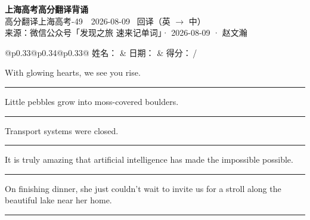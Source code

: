 \documentclass[11pt,a4paper]{article}
\newcommand{\num}[1]{\makebox[1.9em][r]{#1.}\hspace{0.3em}}
\newcommand{\wline}{\noindent\rule{\linewidth}{0.4pt}}
\begin{document}
\pagestyle{plain}
\begin{center}
{\LARGE\bfseries 上海高考高分翻译背诵 }\\[0.25em]
{\large 高分翻译上海高考-49　2026-08-09 \quad\ 回译（英 $\to$ 中）}\\[0.35em]
{\footnotesize 来源：微信公众号「发现之旅 速来记单词」· 2026-08-09 · 赵文瀚}
\end{center}

\vspace{0.4em}
\noindent\begin{tabular}{@{}p{0.33\textwidth}@{}p{0.34\textwidth}@{}p{0.33\textwidth}@{}}
姓名：\underline{\hspace{2.0cm}} & 日期：\underline{\hspace{2.0cm}} & 得分：\underline{\hspace{1.4cm}}\,/ \\
\end{tabular}

\vspace{0.5em}

\vspace{0.8em}
\num{1}With glowing hearts, we see you rise.

\vspace{0.25em}

\wline

\num{2}Little pebbles grow into moss-covered boulders.

\vspace{0.25em}

\wline

\num{3}Transport systems were closed.

\vspace{0.25em}

\wline

\num{4}It is truly amazing that artificial intelligence has made the impossible possible.

\vspace{0.25em}

\wline

\num{5}On finishing dinner, she just couldn’t wait to invite us for a stroll along the beautiful lake near her home.

\vspace{0.25em}

\wline
\end{document}
